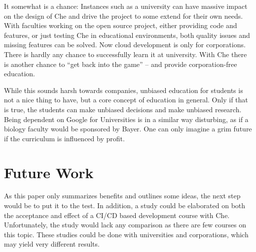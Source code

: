 \documentclass[utf8]{lni}
\begin{document}
It somewhat is a chance: 
Instances such as a university can have massive impact on the design of Che and drive the project to some extend for their own needs. 
With faculties working on the open source project, either providing code and features, or just testing Che in educational environments, both quality issues and missing features can be solved.    
Now cloud development is only for corporations. 
There is hardly any chance to successfully learn it at university. 
With Che there is another chance to “get back into the game” – and provide corporation-free education.  

While this sounds harsh towards companies, unbiased education for students is not a nice thing to have, but a core concept of education in general. 
Only if that is true, the students can make unbiased decisions and make unbiased research. 
Being dependent on Google for Universities is in a similar way disturbing, as if a biology faculty would be sponsored by Bayer. 
One can only imagine a grim future if the curriculum is influenced by profit. 
\section*{Future Work}
\label{sec:FutureWork}
As this paper only summarizes benefits and outlines some ideas, the next step would be to put it to the test.
In addition, a study could be elaborated on both the acceptance and effect of a CI/CD based development course with Che. 
Unfortunately, the study would lack any comparison as there are few courses on this topic. 
These studies could be done with universities and corporations, which 
may yield very different results.   


\end{document}

